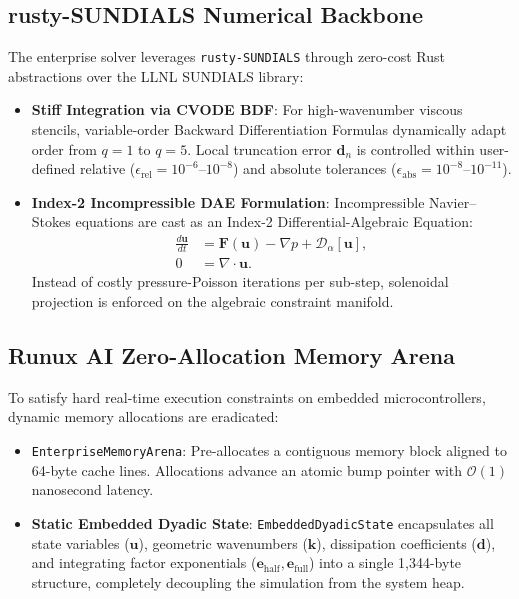 \documentclass[10pt,twocolumn]{article}
\begin{document}
\subsection{rusty-SUNDIALS Numerical Backbone}
The enterprise solver leverages \texttt{rusty-SUNDIALS} through zero-cost Rust abstractions over the LLNL SUNDIALS library:
\begin{itemize}[leftmargin=*]
  \setlength\itemsep{1pt}
  \item \textbf{Stiff Integration via CVODE BDF}: For high-wavenumber viscous stencils, variable-order Backward Differentiation Formulas dynamically adapt order from $q=1$ to $q=5$. Local truncation error $\mathbf{d}_n$ is controlled within user-defined relative ($\epsilon_{\text{rel}} = 10^{-6}$--$10^{-8}$) and absolute tolerances ($\epsilon_{\text{abs}} = 10^{-8}$--$10^{-11}$).
  \item \textbf{Index-2 Incompressible DAE Formulation}: Incompressible Navier--Stokes equations are cast as an Index-2 Differential-Algebraic Equation:
  \begin{equation}
    \begin{aligned}
      \frac{d\mathbf{u}}{dt} &= \mathbf{F}(\mathbf{u}) - \nabla p + \mathcal{D}_{\alpha}[\mathbf{u}], \\
      0 &= \nabla \cdot \mathbf{u}.
    \end{aligned}
  \end{equation}
  Instead of costly pressure-Poisson iterations per sub-step, solenoidal projection is enforced on the algebraic constraint manifold.
\end{itemize}

\subsection{Runux AI Zero-Allocation Memory Arena}
To satisfy hard real-time execution constraints on embedded microcontrollers, dynamic memory allocations are eradicated:
\begin{itemize}[leftmargin=*]
  \setlength\itemsep{1pt}
  \item \texttt{EnterpriseMemoryArena}: Pre-allocates a contiguous memory block aligned to 64-byte cache lines. Allocations advance an atomic bump pointer with $\mathcal{O}(1)$ nanosecond latency.
  \item \textbf{Static Embedded Dyadic State}: \texttt{EmbeddedDyadicState} encapsulates all state variables ($\mathbf{u}$), geometric wavenumbers ($\mathbf{k}$), dissipation coefficients ($\mathbf{d}$), and integrating factor exponentials ($\mathbf{e}_{\text{half}}, \mathbf{e}_{\text{full}}$) into a single 1,344-byte structure, completely decoupling the simulation from the system heap.
\end{itemize}
\end{document}
